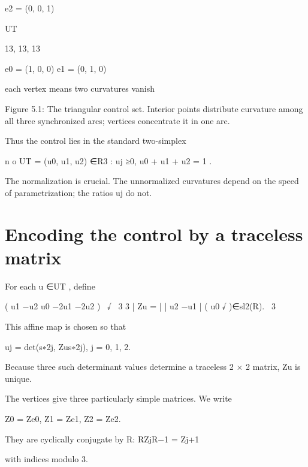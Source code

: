 e2 = (0, 0, 1)


UT


13, 13, 13


\begin{displaytext}
e0 = (1, 0, 0) e1 = (0, 1, 0)
\end{displaytext}

each vertex means two curvatures vanish


\begin{figureplaceholder}
Figure 5.1: The triangular control set. Interior points distribute curvature among all three synchronized arcs; vertices concentrate it in one arc.
\end{figureplaceholder}

Thus the control lies in the standard two-simplex


\begin{displaytext}
n o UT = (u0, u1, u2) ∈R3 : uj ≥0, u0 + u1 + u2 = 1 .
\end{displaytext}

The normalization is crucial. The unnormalized curvatures depend on the speed of parametrization; the ratios uj do not.


\section{Encoding the control by a traceless matrix}

For each u ∈UT , define


\begin{displaytext}
( u1 −u2 u0 −2u1 −2u2 ) \
√ \
3 3 | Zu = | | u2 −u1 | ( u0 √ )∈sl2(R). \
3
\end{displaytext}

This affine map is chosen so that


\begin{displaytext}
uj = det(s∗2j, Zus∗2j), j = 0, 1, 2.
\end{displaytext}

Because three such determinant values determine a traceless 2 × 2 matrix, Zu is unique.


The vertices give three particularly simple matrices. We write


\begin{displaytext}
Z0 = Ze0, Z1 = Ze1, Z2 = Ze2.
\end{displaytext}

They are cyclically conjugate by R: RZjR−1 = Zj+1


with indices modulo 3.


